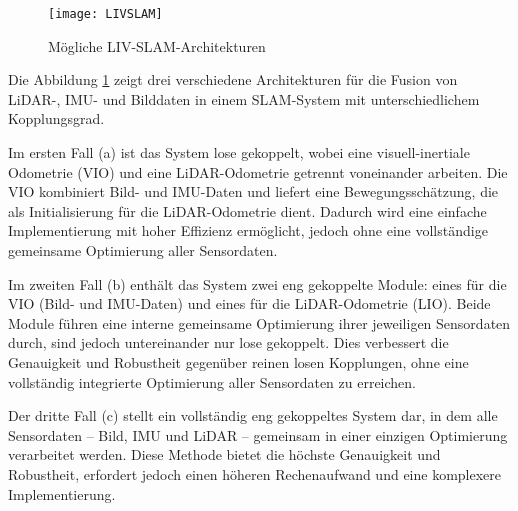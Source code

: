 \begin{figure}
    \centering
    \texttt{[image: LIVSLAM]}
    \caption{Mögliche LIV-SLAM-Architekturen \cite{zhang2024lidarslam}\label{fig:LIVSLAM}}\par
\end{figure}

Die Abbildung \ref{fig:LIVSLAM} zeigt drei verschiedene Architekturen für die Fusion von LiDAR-, IMU- und Bilddaten in einem SLAM-System mit unterschiedlichem Kopplungsgrad.

Im ersten Fall (a) ist das System lose gekoppelt, wobei eine visuell-inertiale Odometrie (VIO) und eine LiDAR-Odometrie getrennt voneinander arbeiten. Die VIO kombiniert Bild- und IMU-Daten und liefert eine Bewegungsschätzung, die als Initialisierung für die LiDAR-Odometrie dient. Dadurch wird eine einfache Implementierung mit hoher Effizienz ermöglicht, jedoch ohne eine vollständige gemeinsame Optimierung aller Sensordaten. \cite{zhang2024lidarslam}

Im zweiten Fall (b) enthält das System zwei eng gekoppelte Module: eines für die VIO (Bild- und IMU-Daten) und eines für die LiDAR-Odometrie (LIO). Beide Module führen eine interne gemeinsame Optimierung ihrer jeweiligen Sensordaten durch, sind jedoch untereinander nur lose gekoppelt. Dies verbessert die Genauigkeit und Robustheit gegenüber reinen losen Kopplungen, ohne eine vollständig integrierte Optimierung aller Sensordaten zu erreichen. \cite{zhang2024lidarslam}

Der dritte Fall (c) stellt ein vollständig eng gekoppeltes System dar, in dem alle Sensordaten – Bild, IMU und LiDAR – gemeinsam in einer einzigen Optimierung verarbeitet werden. Diese Methode bietet die höchste Genauigkeit und Robustheit, erfordert jedoch einen höheren Rechenaufwand und eine komplexere Implementierung. \cite{zhang2024lidarslam}